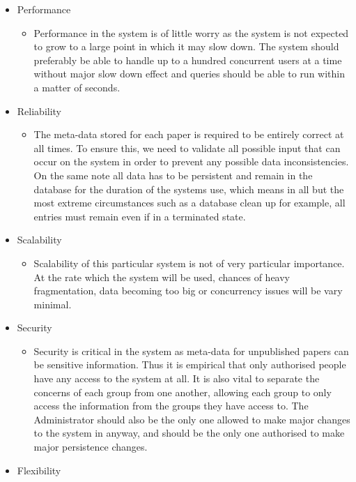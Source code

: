 \documentclass{article}
\begin{document}
	\begin{itemize}
		\item Performance
		\begin{itemize}
			\item Performance in the system is of little worry as the system is not expected to grow to a large point in which it may slow down. The system should preferably be able to handle up to a hundred concurrent users at a time without major slow down effect and queries should be able to run within a matter of seconds.
		\end{itemize}
		\item Reliability
		\begin{itemize}
			\item The meta-data stored for each paper is required to be entirely correct at all times. To ensure this, we need to validate all possible input that can occur on the system in order to prevent any possible data inconsistencies. On the same note all data has to be persistent and remain in the database for the duration of the systems use, which means in all but the most extreme circumstances such as a database clean up for example, all entries must remain even if in a terminated state.
		\end{itemize}
		\item Scalability
		\begin{itemize}
			\item Scalability of this particular system is not of very particular importance. At the rate which the system will be used, chances of heavy fragmentation, data becoming too big or concurrency issues will be vary minimal.
		\end{itemize}
		\item Security
		\begin{itemize}
			\item Security is critical in the system as meta-data for unpublished papers can be sensitive information. Thus it is empirical that only authorised people have any access to the system at all. It is also vital to separate the concerns of each group from one another, allowing each group to only access the information from the groups they have access to. The Administrator should also be the only one allowed to make major changes to the system in anyway, and should be the only one authorised to make major persistence changes. 
		\end{itemize}
		\item Flexibility
		\begin{itemize}

\end{itemize}
\end{itemize}
\end{document}
